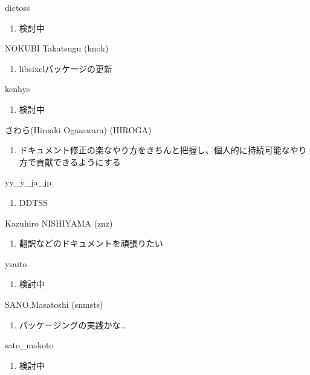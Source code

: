 \begin{prework}{ dictoss }
  \begin{enumerate}
  \item 検討中
  \end{enumerate}
\end{prework}

\begin{prework}{ NOKUBI Takatsugu (knok) }
  \begin{enumerate}
  \item libsixelパッケージの更新
  \end{enumerate}
\end{prework}

\begin{prework}{ kenhys }
  \begin{enumerate}
  \item 検討中
  \end{enumerate}
\end{prework}

\begin{prework}{ さわら(Hiroaki Ogasawara) (HIROGA) }
  \begin{enumerate}
  \item ドキュメント修正の楽なやり方をきちんと把握し、個人的に持続可能なやり方で貢献できるようにする
  \end{enumerate}
\end{prework}

\begin{prework}{ yy\_y\_ja\_jp }
  \begin{enumerate}
  \item DDTSS
  \end{enumerate}
\end{prework}

\begin{prework}{ Kazuhiro NISHIYAMA (znz) }
  \begin{enumerate}
  \item 翻訳などのドキュメントを頑張りたい
  \end{enumerate}
\end{prework}

\begin{prework}{ ysaito }
  \begin{enumerate}
  \item 検討中
  \end{enumerate}
\end{prework}

\begin{prework}{ SANO,Masatoshi (snmsts) }
  \begin{enumerate}
  \item パッケージングの実践かな…
  \end{enumerate}
\end{prework}

\begin{prework}{ sato\_makoto }
  \begin{enumerate}
  \item 検討中
  \end{enumerate}
\end{prework}
